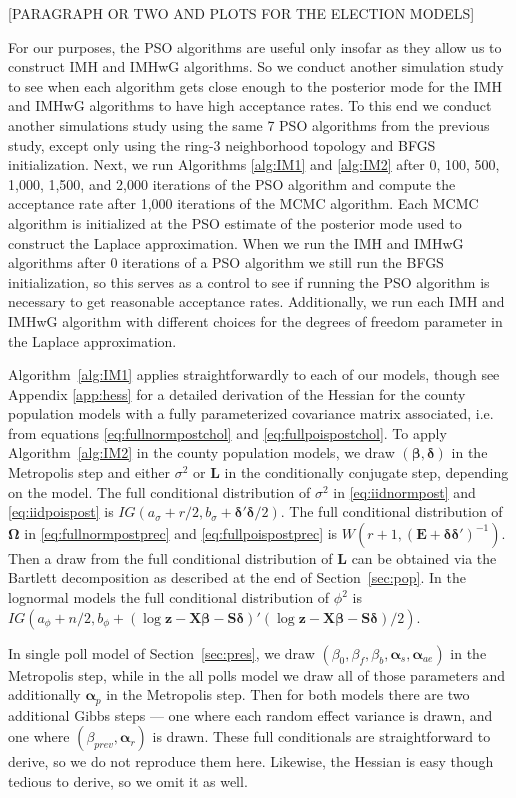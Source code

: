 \documentclass[12pt]{article}
\begin{document}
[PARAGRAPH OR TWO AND PLOTS FOR THE ELECTION MODELS]

For our purposes, the PSO algorithms are useful only insofar as they allow us to construct IMH and IMHwG algorithms. So we conduct another simulation study to see when each algorithm gets close enough to the posterior mode for the IMH and IMHwG algorithms to have high acceptance rates. To this end we conduct another simulations study using the same 7 PSO algorithms from the previous study, except only using the ring-3 neighborhood topology and BFGS initialization. Next, we run Algorithms \ref{alg:IM1} and \ref{alg:IM2} after 0, 100, 500, 1,000, 1,500, and 2,000 iterations of the PSO algorithm and compute the acceptance rate after 1,000 iterations of the MCMC algorithm. Each MCMC algorithm is initialized at the PSO estimate of the posterior mode used to construct the Laplace approximation. When we run the IMH and IMHwG algorithms after 0 iterations of a PSO algorithm we still run the BFGS initialization, so this serves as a control to see if running the PSO algorithm is necessary to get reasonable acceptance rates. Additionally, we run each IMH and IMHwG algorithm with different choices for the degrees of freedom parameter in the Laplace approximation.

Algorithm~\ref{alg:IM1} applies straightforwardly to each of our models, though see Appendix \ref{app:hess} for a detailed derivation of the Hessian for the county population models with a fully parameterized covariance matrix associated, i.e. from equations \eqref{eq:fullnormpostchol} and \eqref{eq:fullpoispostchol}. To apply Algorithm~\ref{alg:IM2} in the county population models, we draw $(\bm{\beta},\bm{\delta})$ in the Metropolis step and either $\sigma^2$ or $\bm{L}$ in the conditionally conjugate step, depending on the model. The full conditional distribution of $\sigma^2$ in \eqref{eq:iidnormpost} and \eqref{eq:iidpoispost} is $IG(a_{\sigma} + r/2, b_{\sigma} + \bm{\delta}'\bm{\delta}/2)$. The full conditional distribution of $\bm{\Omega}$ in \eqref{eq:fullnormpostprec} and \eqref{eq:fullpoispostprec} is $W(r + 1, (\bm{E} + \bm{\delta}\bm{\delta}')^{-1})$. Then a draw from the full conditional distribution of $\bm{L}$ can be obtained via the Bartlett decomposition as described at the end of Section~\ref{sec:pop}. In the lognormal models the full conditional distribution of $\phi^2$ is $IG(a_{\phi} + n/2, b_{\phi} + (\log \bm{z} - \bm{X}\bm{\beta} - \bm{S}\bm{\delta})'(\log \bm{z} - \bm{X}\bm{\beta} - \bm{S}\bm{\delta})/2)$. 

In single poll model of Section~\ref{sec:pres}, we draw $(\beta_0, \beta_f, \beta_b, \bm{\alpha}_{s}, \bm{\alpha}_{ae})$ in the Metropolis step, while in the all polls model we draw all of those parameters and additionally $\bm{\alpha}_p$ in the Metropolis step. Then for both models there are two additional Gibbs steps --- one where each random effect variance is drawn, and one where $(\beta_{prev}, \bm{\alpha}_r)$ is drawn. These full conditionals are straightforward to derive, so we do not reproduce them here. Likewise, the Hessian is easy though tedious to derive, so we omit it as well.
\end{document}
